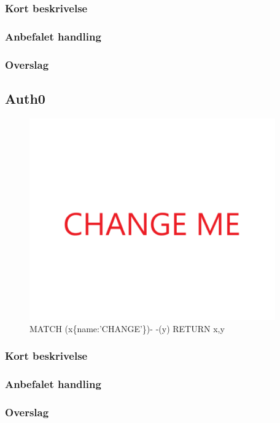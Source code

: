 \documentclass{article}
\begin{document}
\subsubsection{Kort beskrivelse}
\subsubsection{Anbefalet handling}
\subsubsection{Overslag}
\subsection{Auth0}
\begin{figure}[h]
\includegraphics[width=300pt]{CHANGE.PNG}
\caption{MATCH (x\{name:'CHANGE'\})- -(y) RETURN x,y}
\end{figure}
\subsubsection{Kort beskrivelse}
\subsubsection{Anbefalet handling}
\subsubsection{Overslag}
\end{document}
